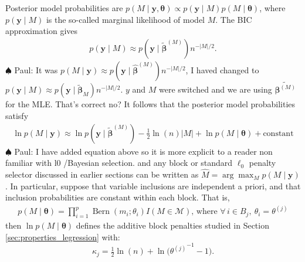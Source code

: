 \documentclass[aos]{imsart}
\theoremstyle{plain}
\newcommand{\paul}[1]{{\small{\color{green} \sf $\spadesuit$ Paul: #1}}}
\newcommand{\bs}{\boldsymbol}
\begin{document}
Posterior model probabilities are $p(M \mid \bs y, \bs \theta) \propto p(\bs y \mid M) p(M \mid \bs \theta)$, where $p(\bs y \mid M)$ is the so-called marginal likelihood of model $M$. The BIC approximation \citep{BIC} gives
\begin{align*}
 p( \bs y  \mid M)\approx p(\bs y \mid \tilde{\bs \beta}^{(M)})n^{-|M|/2}.
\end{align*}
\paul{It was $p( M \mid \bs y ) \approx p(\bs y \mid \hat{\bs \beta}^{(M)})n^{-|M|/2}$, I haved changed to $p( \bs y  \mid M) \approx p(\bs y \mid \tilde{\bs \beta}_M)n^{-|M|/2}$. $y$ and $M$ were switched and we are using $\tilde{\bs \beta^{(M)}}$ for the MLE. That's correct no?}
It follows that the posterior model probabilities satisfy
\begin{align*}
\ln p(M \mid\bs y) \approx \ln p(\bs y \mid \tilde{\bs \beta}^{(M)}) - \frac{1}{2}\ln(n)|M| + \ln p(M\mid\bs \theta) + \text{constant}
\end{align*}
\paul{I have added equation above so it is more explicit to a reader non familiar with l0 /Bayesian selection.}
and any block or standard $\ell_0$ penalty selector discussed in earlier sections can be written as $\hat{M}= \arg\max_M p(M \mid \bs y)$. 
In particular, suppose that variable inclusions are independent a priori, and that inclusion probabilities are constant within each block. That is,
\begin{align} \label{eq:block_modelprior}
p( M \mid \boldsymbol{\theta})=
        \prod_{i=1}^p \operatorname{Bern}\left(m_i ; \theta_i\right) I(M \in \mathcal{M}) \mbox{, where } \forall \, i\in B_j, \: \theta_i=\theta^{(j)}
\end{align}
then $\ln p(M \mid \bs \theta)$ defines the additive block penalties studied in Section \ref{sec:properties_legression} with:
\begin{equation}\label{eq:blockpenpriorinclu}
    \kappa_j=\tfrac{1}{2}\ln(n)+\ln\big({\theta^{(j)}}^{-1}-1\big).
\end{equation}
\end{document}
